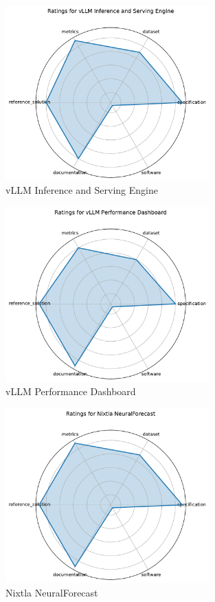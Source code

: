 \documentclass{article}
\begin{document}
\begin{figure}[h!]
  \centering
  \includegraphics[width=0.7\textwidth]{vLLM Inference and Serving Engine_radar.pdf}
  \caption{vLLM Inference and Serving Engine}
\end{figure}

\begin{figure}[h!]
  \centering
  \includegraphics[width=0.7\textwidth]{vLLM Performance Dashboard_radar.pdf}
  \caption{vLLM Performance Dashboard}
\end{figure}

\begin{figure}[h!]
  \centering
  \includegraphics[width=0.7\textwidth]{Nixtla NeuralForecast_radar.pdf}
  \caption{Nixtla NeuralForecast}
\end{figure}
\end{document}
